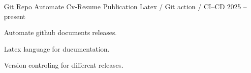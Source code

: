 \begin{cventries}
  \cventry
    {\href{https://github.com/drsamitha/Awesome-CV}{Git Repo}} %
    {Automate Cv-Resume Publication} %
    {Latex / Git action / CI--CD} %
    {2025 -- present} %
    {
      \begin{cvitems} %
        \item {Automate github documents releases.}
        \item {Latex language for ducumentation.}
        \item {Version controling for different releases.}
      \end{cvitems}
    }


\end{cventries}
